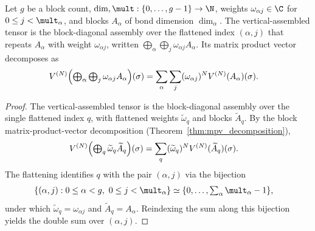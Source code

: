 \begin{lemma}
    \label{lem:mpv_vertical_assembled}
    \leanok
    Let $g$ be a block count,
    $\dim,\mult:\{0,\ldots,g-1\}\to\N$, weights
    $\omega_{\alpha j}\in\C$ for $0\leq j<\mult_\alpha$, and blocks
    $A_\alpha$ of bond dimension $\dim_\alpha$. The vertical-assembled tensor is the
    block-diagonal assembly over the flattened index $(\alpha,j)$ that repeats
    $A_\alpha$ with weight $\omega_{\alpha j}$, written
    $\bigoplus_\alpha\bigoplus_j\omega_{\alpha j}A_\alpha$. Its matrix product
    vector decomposes as
    \begin{align}
        V^{(N)}\Bigl(\textstyle\bigoplus_\alpha\bigoplus_j
        \omega_{\alpha j}A_\alpha\Bigr)(\sigma)
        &=\sum_\alpha\sum_j(\omega_{\alpha j})^N
          V^{(N)}(A_\alpha)(\sigma).
        \label{eq:mpdo_vertical_mpv_sum}
    \end{align}
\end{lemma}
\begin{proof}\leanok
    The vertical-assembled tensor is the block-diagonal assembly over the single
    flattened index $q$, with flattened weights $\widetilde\omega_q$ and blocks
    $\widetilde A_q$. By the block matrix-product-vector decomposition
    (Theorem~\ref{thm:mpv_decomposition}),
    \begin{align}
        V^{(N)}\Bigl(\textstyle\bigoplus_q
        \widetilde\omega_q\widetilde A_q\Bigr)(\sigma)
        &=\sum_q(\widetilde\omega_q)^N
          V^{(N)}(\widetilde A_q)(\sigma).
        \notag
    \end{align}
    The flattening identifies $q$ with the pair $(\alpha,j)$ via the bijection
    \begin{align}
        \{(\alpha,j):0\leq\alpha<g,\ 0\leq j<\mult_\alpha\}
        &\simeq
        \{0,\ldots,\textstyle\sum_\alpha\mult_\alpha-1\},
        \notag
    \end{align}
    under which $\widetilde\omega_q=\omega_{\alpha j}$ and
    $\widetilde A_q=A_\alpha$. Reindexing the sum along this bijection yields the
    double sum over $(\alpha,j)$.
\end{proof}

